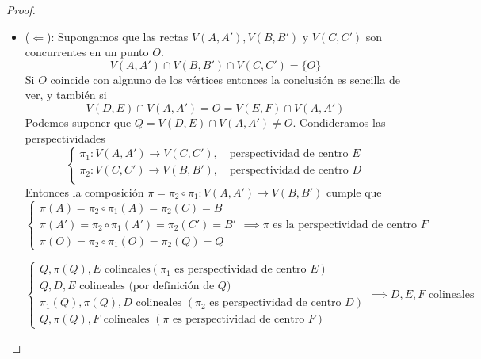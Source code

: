 \begin{proof}
    \leavevmode
    \begin{itemize}
        \item ($\Leftarrow$): Supongamos que las rectas $V(A,A'), V(B,B')$ y $V(C,C')$ son concurrentes en un punto $O$.\\
        \[
            V(A,A') \cap V(B,B') \cap V(C,C') = \{O\}
        \]
        Si $O$ coincide con algnuno de los vértices entonces la conclusión es sencilla de ver, y también si
        \[
            V(D,E) \cap V(A,A') = O = V(E,F) \cap V(A,A') 
        \]
        Podemos suponer que $Q = V(D,E) \cap V(A,A') \neq O$. Condideramos las perspectividades
        \[
            \begin{cases}
            \pi_1 : V(A,A') \to V(C,C'), \quad \text{perspectividad de centro } E \\
            \pi_2 : V(C,C') \to V(B,B'), \quad \text{perspectividad de centro } D \\                
            \end{cases}
        \]
        Entonces la composición $\pi = \pi_2 \circ \pi_1 : V(A,A') \to V(B,B')$ cumple que 
        \[
            \begin{cases}
                \pi(A) = \pi_2 \circ \pi_1(A) = \pi_2(C) = B \\
                \pi(A') = \pi_2 \circ \pi_1(A') = \pi_2(C') = B' \\
                \pi(O) = \pi_2 \circ \pi_1(O) = \pi_2(Q) = Q
            \end{cases} \implies \pi \text{ es la perspectividad de centro } F
        \]

        \[
            \begin{cases}
                Q, \pi(Q), E \text{ colineales} (\pi_1 \text{ es perspectividad de centro }E) \\
                Q, D, E \text{ colineales (por definición de } Q) \\
                \pi_1(Q), \pi(Q), D \text{ colineales } (\pi_2 \text{ es perspectividad de centro }D) \\
                Q, \pi(Q), F \text{ colineales } (\pi \text{ es perspectividad de centro }F)
            \end{cases} \implies D,E,F \text{ colineales}
        \]
        
    \end{itemize}
\end{proof}
